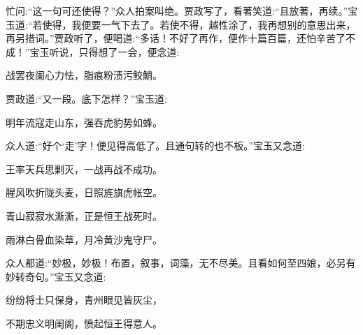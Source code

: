 \begin{parag}
    忙问:“这一句可还使得？”众人拍案叫绝。贾政写了，看著笑道:“且放著，再续。”宝玉道:“若使得，我便要一气下去了。若使不得，越性涂了，我再想别的意思出来，再另措词。”贾政听了，便喝道:“多话！不好了再作，便作十篇百篇，还怕辛苦了不成！”宝玉听说，只得想了一会，便念道:
\end{parag}


\begin{poem}
    \begin{pl}战罢夜阑心力怯，脂痕粉渍污鲛鮹。\end{pl}
\end{poem}


\begin{parag}
    贾政道:“又一段。底下怎样？”宝玉道:
\end{parag}


\begin{poem}
    \begin{pl}明年流寇走山东，强吞虎豹势如蜂。\end{pl}
\end{poem}


\begin{parag}
    众人道:“好个‘走’字！便见得高低了。且通句转的也不板。”宝玉又念道:
\end{parag}


\begin{poem}
    \begin{pl}王率天兵思剿灭，一战再战不成功。\end{pl}

    \begin{pl}腥风吹折陇头麦，日照旌旗虎帐空。\end{pl}

    \begin{pl}青山寂寂水澌澌，正是恒王战死时。\end{pl}

    \begin{pl}雨淋白骨血染草，月冷黄沙鬼守尸。\end{pl}

\end{poem}


\begin{parag}
    众人都道:“妙极，妙极！布置，叙事，词藻，无不尽美。且看如何至四娘，必另有妙转奇句。”宝玉又念道:
\end{parag}


\begin{poem}
    \begin{pl}纷纷将士只保身，青州眼见皆灰尘，\end{pl}

    \begin{pl}不期忠义明闺阁，愤起恒王得意人。\end{pl}

\end{poem}


